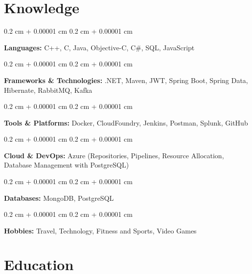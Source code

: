 \documentclass[10pt, letterpaper]{article}
\newenvironment{onecolentry}{
    \begin{adjustwidth}{
        0.2 cm + 0.00001 cm
    }{
        0.2 cm + 0.00001 cm
    }
}{
    \end{adjustwidth}
} %
\begin{document}
    \section{Knowledge}



        
        \begin{onecolentry}
            \textbf{Languages:} C++, C, Java, Objective-C, C\#, SQL, JavaScript
        \end{onecolentry}

        \vspace{0.2 cm}

        \begin{onecolentry}
            \textbf{Frameworks \& Technologies:} .NET, Maven, JWT, Spring Boot, Spring Data, Hibernate, RabbitMQ, Kafka
        \end{onecolentry}

        \vspace{0.2 cm}

        \begin{onecolentry}
            \textbf{Tools \& Platforms:} Docker, CloudFoundry, Jenkins, Postman, Splunk, GitHub
        \end{onecolentry}

        \vspace{0.2 cm}

        \begin{onecolentry}
            \textbf{Cloud \& DevOps:} Azure (Repositories, Pipelines, Resource Allocation, Database Management with PostgreSQL)
        \end{onecolentry}

        \vspace{0.2 cm}

        \begin{onecolentry}
            \textbf{Databases:} MongoDB, PostgreSQL
        \end{onecolentry}

        \vspace{0.2 cm}

        \begin{onecolentry}
            \textbf{Hobbies:} Travel, Technology, Fitness and Sports, Video Games
        \end{onecolentry}


    
    \section{Education}
\end{document}
